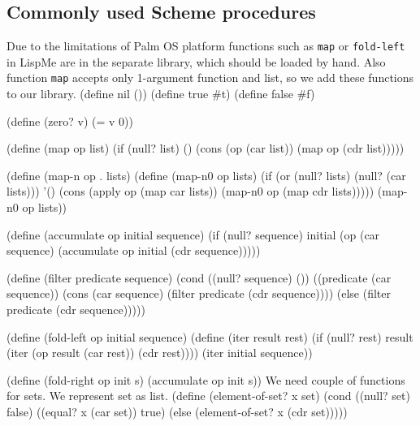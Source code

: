 \documentclass[a4paper,10pt]{article}
\theoremstyle{definition} \newtheorem{Def}{Definition}
\begin{document}
\subsection{Commonly used Scheme procedures}
\label{sec:commonly-used-scheme}

\nwenddocs{}\nwdocspar
Due to the limitations of Palm OS platform functions such as {\tt{}map} or {\tt{}fold-left} in LispMe are in the separate library, which should be loaded by hand. Also function {\tt{}map} accepts only 1-argument function and list, so we add these functions to our library. 
\nwenddocs{}\endmoddef
(define nil ())
(define true #t)
(define false #f)

(define (zero? v)
        (= v 0))

(define (map op list)
        (if (null? list) ()
                (cons (op (car list)) (map op (cdr list)))))

(define (map-n op . lists) 
    (define (map-n0 op  lists)
        (if (or (null? lists) (null? (car lists))) '()
        (cons (apply op (map car lists))
                (map-n0 op  (map cdr lists)))))
    (map-n0 op lists))

(define (accumulate op initial sequence)
  (if (null? sequence)
      initial
      (op (car sequence)
          (accumulate op initial (cdr sequence)))))

(define (filter predicate sequence)
  (cond ((null? sequence) ())
        ((predicate (car sequence))
         (cons (car sequence)
               (filter predicate (cdr sequence))))
        (else (filter predicate (cdr sequence)))))

(define (fold-left op initial sequence)
  (define (iter result rest)
    (if (null? rest)
        result
        (iter (op result (car rest))
              (cdr rest))))
  (iter initial sequence))

(define (fold-right op init s) (accumulate op init s))
\nwendcode{}\nwdocspar
We need couple of functions for sets. We represent set as list.
\nwenddocs{}\endmoddef
(define (element-of-set? x set)
  (cond ((null? set) false)
        ((equal? x (car set)) true)
        (else (element-of-set? x (cdr set)))))
\end{document}

